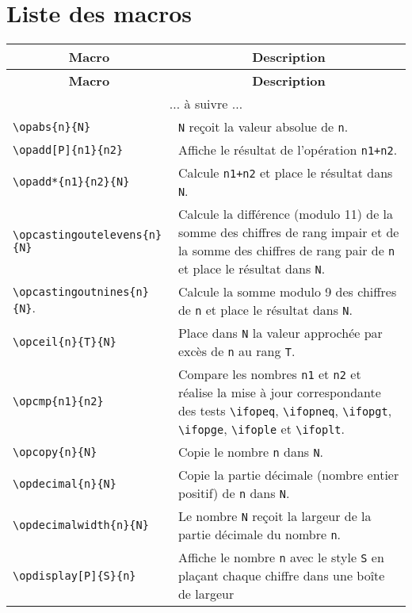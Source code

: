 \documentclass[12pt]{report}
\begin{document}
\section{Liste des macros}
\label{sec:Liste des macros}
\noindent{}%
\begin{longtable}{|l|p{6.3cm}|}
  \hline
  \multicolumn{1}{|c|}{\textbf{Macro}} &
  \multicolumn{1}{c|}{\textbf{Description}} \\\hline\hline
  \endfirsthead
  \hline
  \multicolumn{1}{|c|}{\textbf{Macro}} &
  \multicolumn{1}{c|}{\textbf{Description}} \\\hline\hline
  \endhead
  \hline
  \multicolumn{2}{|c|}{$\ldots$ à suivre $\ldots$}\\
  \hline
  \endfoot
  \hline
  \endlastfoot
  \verb+\opabs{n}{N}+ &
  \verb+N+ reçoit la valeur absolue de \verb+n+. \\\hline
  \verb+\opadd[P]{n1}{n2}+ &
  Affiche le résultat de l'opération \verb-n1+n2-. \\\hline
  \verb+\opadd*{n1}{n2}{N}+ &
  Calcule \verb-n1+n2- et place le résultat dans
  \verb+N+. \\\hline
  \verb+\opcastingoutelevens{n}{N}+ &
  Calcule la différence (modulo 11) de la somme des chiffres de rang
  impair et de la somme des chiffres de rang pair de \verb+n+ et
  place le résultat dans \verb+N+. \\\hline
  \verb+\opcastingoutnines{n}{N}+. &
  Calcule la somme modulo 9 des chiffres de \verb+n+ et place le
  résultat dans \verb+N+. \\\hline
  \verb+\opceil{n}{T}{N}+ &
  Place dans \verb+N+ la valeur approchée par excès de
  \verb+n+ au rang \verb+T+. \\\hline
  \verb+\opcmp{n1}{n2}+ &
  Compare les nombres \verb+n1+ et \verb+n2+ et réalise la
  mise à jour correspondante des tests \verb+\ifopeq+,
  \verb+\ifopneq+, \verb+\ifopgt+, \verb+\ifopge+,
  \verb+\ifople+ et \verb+\ifoplt+. \\\hline
  \verb+\opcopy{n}{N}+ &
  Copie le nombre \verb+n+ dans \verb+N+. \\\hline
  \verb+\opdecimal{n}{N}+ &
  Copie la partie décimale (nombre entier positif) de \verb+n+
  dans \verb+N+. \\\hline
  \verb+\opdecimalwidth{n}{N}+ &
  Le nombre \verb+N+ reçoit la largeur de la partie décimale du
  nombre \verb+n+. \\\hline
  \verb+\opdisplay[P]{S}{n}+ &
  Affiche le nombre \verb+n+ avec le style \verb+S+ en
  plaçant chaque chiffre dans une boîte de largeur

\end{longtable}
\end{document}
